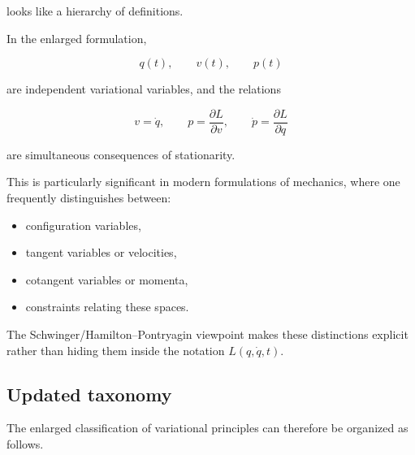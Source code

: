 looks like a hierarchy of definitions.

In the enlarged formulation,

$$q(t),\qquad v(t),\qquad p(t)$$

are independent variational variables, and the relations

$$
v=\dot q,
\qquad
p=\frac{\partial L}{\partial v},
\qquad
\dot p=\frac{\partial L}{\partial q}
$$

are simultaneous consequences of stationarity.

This is particularly significant in modern formulations of mechanics, where one frequently distinguishes between:

\begin{itemize}
\item configuration variables,
\item tangent variables or velocities,
\item cotangent variables or momenta,
\item constraints relating these spaces.
\end{itemize}

The Schwinger/Hamilton--Pontryagin viewpoint makes these distinctions explicit rather than hiding them inside the notation \(L(q,\dot q,t)\).

\subsection{Updated taxonomy}

The enlarged classification of variational principles can therefore be organized as follows.

